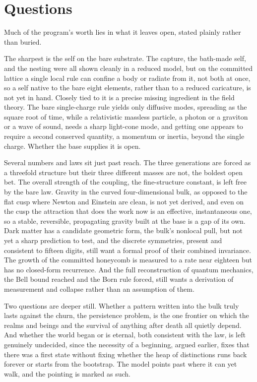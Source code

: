\section{Questions}

Much of the program's worth lies in what it leaves open, stated plainly rather than buried.

The sharpest is the self on the bare substrate. The capture, the bath-made self, and the nesting were all shown cleanly in a reduced model, but on the committed lattice a single local rule can confine a body or radiate from it, not both at once, so a self native to the bare eight elements, rather than to a reduced caricature, is not yet in hand. Closely tied to it is a precise missing ingredient in the field theory. The bare single-charge rule yields only diffusive modes, spreading as the square root of time, while a relativistic massless particle, a photon or a graviton or a wave of sound, needs a sharp light-cone mode, and getting one appears to require a second conserved quantity, a momentum or inertia, beyond the single charge. Whether the base supplies it is open.

Several numbers and laws sit just past reach. The three generations are forced as a threefold structure but their three different masses are not, the boldest open bet. The overall strength of the coupling, the fine-structure constant, is left free by the bare law. Gravity in the curved four-dimensional bulk, as opposed to the flat cusp where Newton and Einstein are clean, is not yet derived, and even on the cusp the attraction that does the work now is an effective, instantaneous one, so a stable, reversible, propagating gravity built at the base is a gap of its own. Dark matter has a candidate geometric form, the bulk's nonlocal pull, but not yet a sharp prediction to test, and the discrete symmetries, present and consistent to fifteen digits, still want a formal proof of their combined invariance. The growth of the committed honeycomb is measured to a rate near eighteen but has no closed-form recurrence. And the full reconstruction of quantum mechanics, the Bell bound reached and the Born rule forced, still wants a derivation of measurement and collapse rather than an assumption of them.

Two questions are deeper still. Whether a pattern written into the bulk truly lasts against the churn, the persistence problem, is the one frontier on which the realms and beings and the survival of anything after death all quietly depend. And whether the world began or is eternal, both consistent with the law, is left genuinely undecided, since the necessity of a beginning, argued earlier, fixes that there was a first state without fixing whether the heap of distinctions runs back forever or starts from the bootstrap. The model points past where it can yet walk, and the pointing is marked as such.

